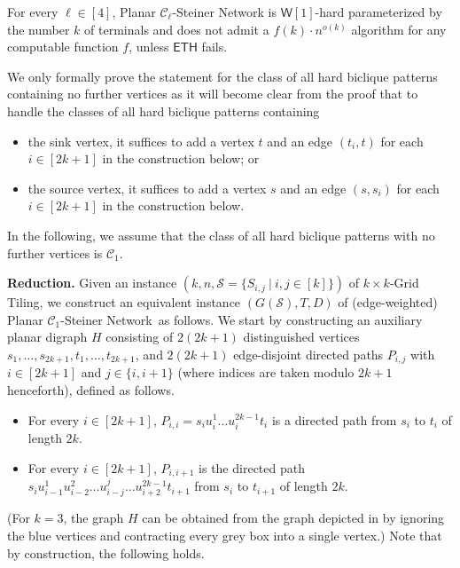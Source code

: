 \begin{lemma}
\label{lem:cleanedbiclique}
For every $\ell \in [4]$,
{\sc Planar $\mathcal{C}_\ell$-Steiner Network} is $\mathsf{W}[1]$-hard parameterized by the number $k$ of terminals and does not admit a $f(k) \cdot n^{o(k)}$ algorithm for any computable function $f$,
unless $\mathsf{ETH}$ fails.
\end{lemma}

We only formally prove the statement for the class of all hard biclique patterns containing no further vertices 
as it will become clear from the proof that to handle the classes of all hard biclique patterns containing
\begin{itemize}
\item the sink vertex, it suffices to add a vertex $t$ and an edge $(t_i,t)$ for each $i \in [2k+1]$ in the construction below; or
\item the source vertex, it suffices to add a vertex $s$ and an edge $(s,s_i)$ for each $i \in [2k+1]$ in the construction below.
\end{itemize} 
In the following, we assume that the class of all hard biclique patterns with no further vertices is $\mathcal{C}_1$.\\

\newcommand{\biclique}{{\sc Planar $\mathcal{C}_1$-Steiner Network}}

\noindent
\textbf{Reduction.} Given an instance $(k,n,\mathcal{S}=\{S_{i,j}~|~i,j \in [k]\})$ of {\sc $k \times k$-Grid Tiling}, we construct an equivalent instance $(G(\mathcal{S}),T,D)$ of (edge-weighted) \biclique\ as follows. We start by constructing an auxiliary planar digraph $H$ consisting of $2(2k+1)$ distinguished vertices $s_1,\ldots,s_{2k+1},t_1,\ldots,t_{2k+1}$, and $2(2k+1)$ edge-disjoint directed paths $P_{i,j}$ with $i \in [2k+1]$ and $j \in \{i,i+1\}$ (where indices are taken modulo $2k+1$ henceforth), defined as follows.
\begin{itemize}
\item For every $i \in [2k+1]$, $P_{i,i}= s_iu_i^1\ldots u_i^{2k-1}t_i$ is a directed path from $s_i$ to $t_i$ of length $2k$.
\item For every $i \in [2k+1]$, $P_{i,i+1}$ is the directed path $s_i u^1_{i-1}u^2_{i-2}\ldots u^j_{i-j}\ldots u^{2k-1}_{i+2}t_{i+1}$ from $s_i$ to $t_{i+1}$ of length $2k$.
\end{itemize}
(For $k=3$, the graph $H$ can be obtained from the graph depicted in  by ignoring the blue vertices and contracting every grey box into a single vertex.) Note that by construction, the following holds.

